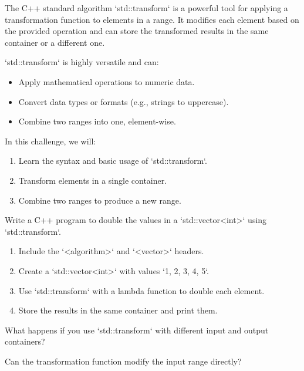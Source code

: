 \begin{challenge}
    \begin{chadescription}
    The C++ standard algorithm `std::transform` is a powerful tool for applying a transformation function to elements in a range. 
    It modifies each element based on the provided operation and can store the transformed results in the same container or a different one.

    `std::transform` is highly versatile and can:
    \begin{itemize}
        \item Apply mathematical operations to numeric data.
        \item Convert data types or formats (e.g., strings to uppercase).
        \item Combine two ranges into one, element-wise.
    \end{itemize}

    In this challenge, we will:
    \begin{enumerate}
        \item Learn the syntax and basic usage of `std::transform`.
        \item Transform elements in a single container.
        \item Combine two ranges to produce a new range.
    \end{enumerate}
    \end{chadescription}

    \begin{task}
    Write a C++ program to double the values in a `std::vector<int>` using `std::transform`.
    \begin{enumerate}
        \item Include the `<algorithm>` and `<vector>` headers.
        \item Create a `std::vector<int>` with values `{1, 2, 3, 4, 5}`.
        \item Use `std::transform` with a lambda function to double each element.
        \item Store the results in the same container and print them.
    \end{enumerate}
    \begin{questions}
        \item What happens if you use `std::transform` with different input and output containers?
        \item Can the transformation function modify the input range directly?
    \end{questions}
    \end{task}


\end{challenge}
